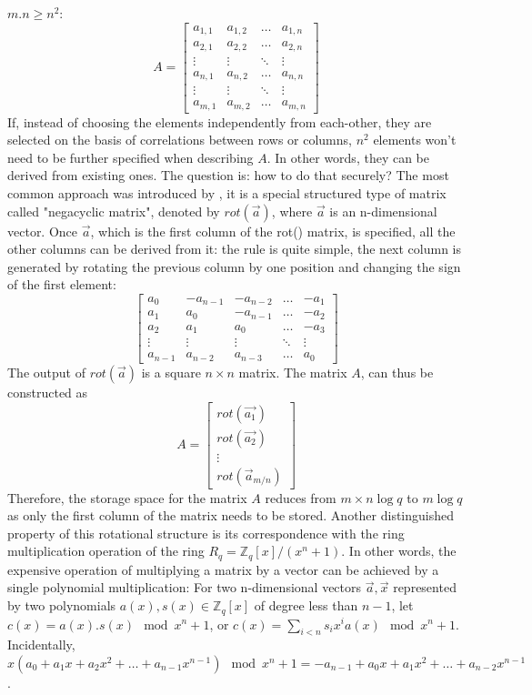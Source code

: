 \begin{description}
  $m.n \geq n^2$:
  \[
    A = \begin{bmatrix}
      a_{1,1}& a_{1,2}& \dots& a_{1,n}\\
      a_{2,1}& a_{2,2}& \dots& a_{2,n}\\
      \vdots& \vdots& \ddots& \vdots\\
      a_{n,1}& a_{n,2}& \dots& a_{n,n}\\
      \vdots& \vdots& \ddots& \vdots\\
      a_{m,1}& a_{m,2}& \dots& a_{m,n}
    \end{bmatrix}
  \]
  If, instead of choosing the elements independently from each-other, they are selected on the basis of correlations between rows or columns, $n^2$ elements won't need to be further specified when describing $A$. In other words, they can be derived from existing
  ones. The question is: how to do that securely? The most common approach was
  introduced by \cite{hoffstein1998ntru, micciancio2007generalized}, it is a
  special structured type of matrix called "negacyclic matrix", denoted by
  $rot(\vec{a})$, where $\vec{a}$ is an n-dimensional vector. Once $\vec{a}$, which is the first column of the rot() matrix, is specified,  all the other
  columns can be derived from it: the rule is quite simple, the
  next column is generated by rotating the previous column by one position and
  changing the sign of the first element:
  \[
    \begin{bmatrix}
      a_{0}& -a_{n-1}& -a_{n-2}& \dots& -a_1\\
      a_1& a_0& -a_{n-1}& \dots& -a_2\\
      a_2& a_1& a_0& \dots& -a_3\\
      \vdots& \vdots& \vdots& \ddots& \vdots\\
      a_{n-1}& a_{n-2}& a_{n-3}& \dots& a_0
    \end{bmatrix}
  \]
  The output of $rot(\vec{a})$ is a square $n \times n$ matrix. The matrix $A$, can thus be constructed as
  \[
    A = \begin{bmatrix}
      rot(\vec{a_1})\\
      rot(\vec{a_2})\\
      \vdots\\
      rot(\vec{a}_{m/n})
    \end{bmatrix}
  \]
  Therefore, the storage space for the matrix $A$ reduces from $m \times n \log q$ to
  $m \log q$ as only the first column of the matrix needs to be stored.  Another
  distinguished property of this rotational structure is its correspondence with the ring
  multiplication operation of the ring $R_q = \mathbb{Z}_q[x]/(x^n+1)$. In other
  words, the expensive operation of multiplying a matrix by a vector can be
  achieved by a single polynomial multiplication: For two n-dimensional vectors
  $\vec{a}, \vec{x}$ represented by two polynomials
  $a(x), s(x) \in \mathbb{Z}_q[x]$ of degree less than $n -1$, let
  $c(x) = a(x).s(x) \mod x^n + 1$, or
  $c(x) = \sum_{i<n}s_ix^ia(x) \mod x^n + 1$. Incidentally,
  $x(a_0 + a_1x + a_2x^2 + \dots + a_{n-1}x^{n-1}) \mod x^n + 1 =-a_{n-1} + a_0x
  + a_1x^2 + \dots + a_{n-2}x^{n-1}$.


\end{description}
